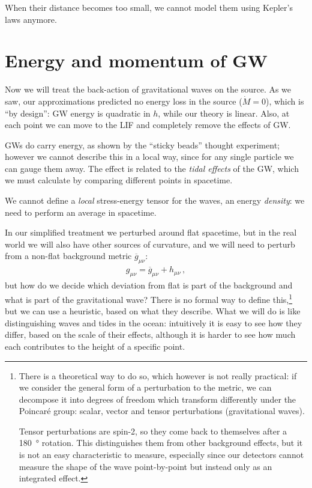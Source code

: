 \documentclass[main.tex]{subfiles}
\begin{document}

When their distance becomes too small, we cannot model them using Kepler's laws anymore. 

\section{Energy and momentum of GW}

Now we will treat the back-action of gravitational waves on the source.
As we saw, our approximations predicted no energy loss in the source (\(\dot{M} = 0\)), which is ``by design'': GW energy is quadratic in \(h\), while our theory is linear. 
Also, at each point we can move to the LIF and completely remove the effects of GW. 
 
GWs do carry energy, as shown by the ``sticky beads'' thought experiment; however we cannot describe this in a local way, since for any single particle we can gauge them away.
The effect is related to the \emph{tidal effects} of the GW, which we must calculate by comparing different points in spacetime. 

We cannot define a \emph{local} stress-energy tensor for the waves, an energy \emph{density}: we need to perform an average in spacetime. 

In our simplified treatment we perturbed around flat spacetime, but in the real world we will also have other sources of curvature, and we will need to perturb from a non-flat background metric \(\overline{g}_{\mu \nu }\): 
%
\begin{align}
g_{\mu \nu } = \overline{g}_{\mu \nu } + h_{\mu \nu }
\,,
\end{align}
%
but how do we decide which deviation from flat is part of the background and what is part of the gravitational wave?
There is no formal way to define this,\footnote{There is a theoretical way to do so, which however is not really practical: if we consider the general form of a perturbation to the metric, we can decompose it into degrees of freedom which transform differently under the Poincaré group: scalar, vector and tensor perturbations (gravitational waves). 

Tensor perturbations are spin-2, so they come back to themselves after a \SI{180}{\degree} rotation. This distinguishes them from other background effects, but it is not an easy characteristic to measure, especially since our detectors cannot measure the shape of the wave point-by-point but instead only as an integrated effect.
}
but we can use a heuristic, based on what they describe. 
What we will do is like distinguishing waves and tides in the ocean: intuitively it is easy to see how they differ, based on the scale of their effects, although it is harder to see how much each contributes to the height of a specific point.
\end{document}
